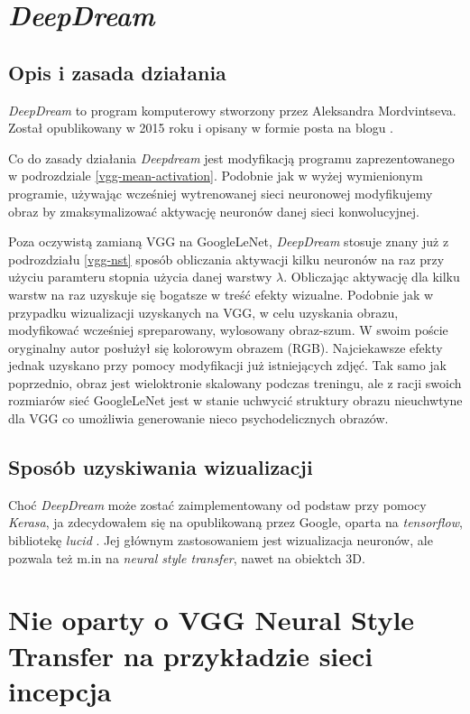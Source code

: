 \section{\textit{DeepDream}}

\subsection{Opis i zasada działania}

\textit{DeepDream} to  program komputerowy stworzony przez Aleksandra Mordvintseva. Został opublikowany  w 2015 roku i opisany w formie posta na blogu \cite{deepdream}.

Co do zasady działania \textit{Deepdream} jest modyfikacją programu zaprezentowanego w podrozdziale \ref{vgg-mean-activation}. Podobnie jak w wyżej wymienionym programie, używając wcześniej wytrenowanej sieci neuronowej modyfikujemy obraz by zmaksymalizować aktywację neuronów danej sieci konwolucyjnej.

Poza oczywistą zamianą VGG na GoogleLeNet, \textit{DeepDream} stosuje znany już z podrozdziału
\ref{vgg-nst} sposób obliczania aktywacji kilku neuronów na raz przy użyciu paramteru stopnia 
użycia danej warstwy \(\lambda\). Obliczając aktywację dla kilku warstw na raz uzyskuje się bogatsze w treść efekty wizualne. Podobnie jak w przypadku wizualizacji uzyskanych na VGG, w celu uzyskania obrazu,
modyfikować wcześniej spreparowany, wylosowany obraz-szum. W swoim poście oryginalny autor posłużył się kolorowym obrazem (RGB). Najciekawsze efekty jednak uzyskano przy pomocy modyfikacji już istniejących zdjęć. Tak samo jak poprzednio, obraz jest wieloktronie skalowany podczas treningu, ale z racji swoich rozmiarów sieć GoogleLeNet jest w stanie uchwycić struktury obrazu nieuchwtyne dla VGG co umożliwia generowanie 
nieco psychodelicznych obrazów.

\subsection{Sposób uzyskiwania wizualizacji}
Choć \textit{DeepDream} może zostać zaimplementowany od podstaw przy pomocy \textit{Kerasa}, ja zdecydowałem się na  
opublikowaną przez Google, oparta na \textit{tensorflow}, bibliotekę \textit{lucid} \cite{lucidrepo}. Jej głównym zastosowaniem jest wizualizacja neuronów, ale pozwala też m.in na \textit{neural style transfer}, nawet na obiektch 3D.

\section{Nie oparty o VGG Neural Style Transfer na przykładzie sieci incepcja}
